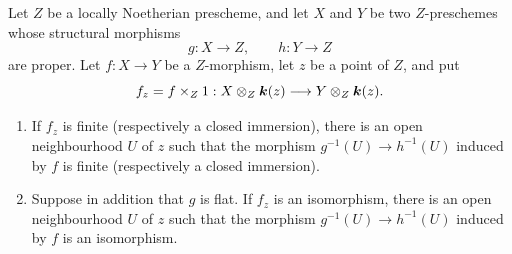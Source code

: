 \begin{proposition}[4.6.7]
\label{III.4.6.7}
Let $Z$ be a locally Noetherian prescheme, and let $X$ and $Y$ be
two $Z$-preschemes whose structural morphisms
\[
  g:X\longrightarrow Z,\qquad h:Y\longrightarrow Z
\]
are proper.  Let $f:X\to Y$ be a $Z$-morphism, let $z$ be a point
of $Z$, and put
\[
  f_z=f\times_Z1:
  X\otimes_Z\boldsymbol{k}(z)
  \longrightarrow
  Y\otimes_Z\boldsymbol{k}(z).
\]
\begin{enumerate}
\item[{\rm(i)}] If $f_z$ is finite \textup{(respectively} a closed immersion),
  there is an open neighbourhood $U$ of $z$ such that the morphism $g^{-1}(U)\longrightarrow h^{-1}(U)$
  induced by $f$ is finite \textup{(respectively} a closed immersion).
\item[{\rm(ii)}] Suppose in addition that $g$ is flat.  If $f_z$ is an
  isomorphism, there is an open neighbourhood $U$ of $z$ such that
  the morphism $g^{-1}(U)\to h^{-1}(U)$ induced by $f$ is an
  isomorphism.
\end{enumerate}
\end{proposition}

